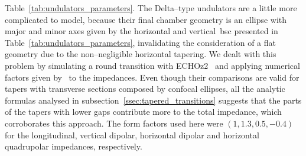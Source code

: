     Table~\ref{tab:undulators_parameters}. The Delta--type undulators are a little more complicated to model, because their final chamber geometry is an ellipse with major and minor axes given by the horizontal and vertical~\gls{bsc} presented in Table~\ref{tab:undulators_parameters}, invalidating the consideration of a flat geometry due to the non--negligible horizontal tapering. We dealt with this problem by simulating a round transition with ECHOz2~\cite{Zagorodnov2005} and applying numerical factors given by~ to the impedances.
    Even though their comparisons are valid for tapers with transverse sections composed by confocal ellipses, all the analytic formulas analysed in subsection~\ref{ssec:tapered_transitions} suggests that the parts of the tapers with lower gaps contribute more to the total impedance, which corroborates this approach. The form factors used here were $(1,1.3,0.5,-0.4)$ for the longitudinal, vertical dipolar, horizontal dipolar and horizontal quadrupolar impedances, respectively.

